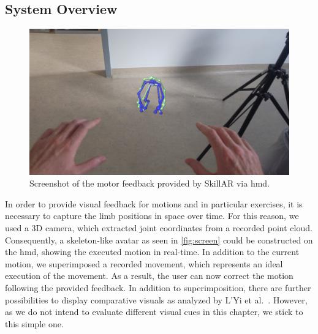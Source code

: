 \subsection{System Overview \label{sec:overview}}
\begin{figure}[h!]
	\centering
	\includegraphics[width=\linewidth]{pictures/HoloLensScreenshot.jpg}
	\caption{Screenshot of the motor feedback provided by SkillAR via \acrshort{hmd}. \label{fig:screen}}
\end{figure}
In order to provide visual feedback for motions and in particular exercises, it is necessary to capture the limb positions in space over time. For this reason, we used a 3D camera, which extracted joint coordinates from a recorded point cloud. Consequently, a skeleton-like avatar as seen in \autoref{fig:screen} could be constructed on the \acrshort{hmd}, showing the executed motion in real-time. In addition to the current motion, we superimposed a recorded movement, which represents an ideal execution of the movement. As a result, the user can now correct the motion following the provided feedback. In addition to superimposition, there are further possibilities to display comparative visuals as analyzed by L'Yi et al.~\cite{lyi2021comparative}. However, as we do not intend to evaluate different visual cues in this chapter, we stick to this simple one.


